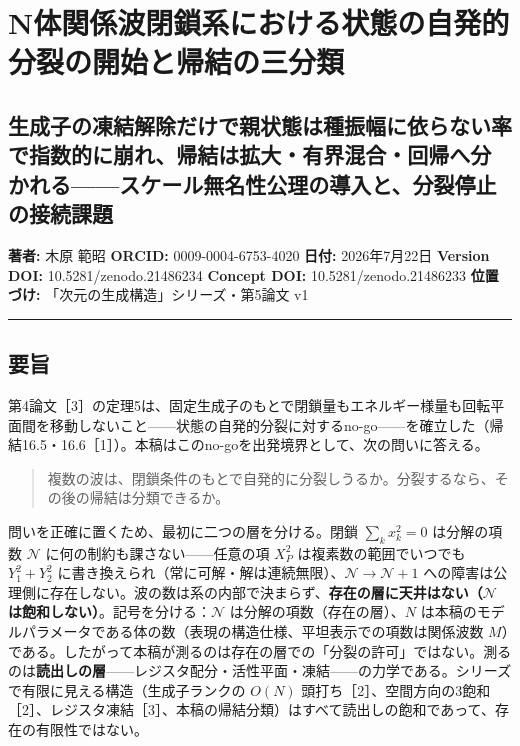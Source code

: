 \documentclass[
  a4paper,
]{ltjsarticle}
\author{}
\date{}
\begin{document}
\section{N体関係波閉鎖系における状態の自発的分裂の開始と帰結の三分類}\label{nux4f53ux95a2ux4fc2ux6ce2ux9589ux9396ux7cfbux306bux304aux3051ux308bux72b6ux614bux306eux81eaux767aux7684ux5206ux88c2ux306eux958bux59cbux3068ux5e30ux7d50ux306eux4e09ux5206ux985e}

\subsection{生成子の凍結解除だけで親状態は種振幅に依らない率で指数的に崩れ、帰結は拡大・有界混合・回帰へ分かれる------スケール無名性公理の導入と、分裂停止の接続課題}\label{ux751fux6210ux5b50ux306eux51cdux7d50ux89e3ux9664ux3060ux3051ux3067ux89aaux72b6ux614bux306fux7a2eux632fux5e45ux306bux4f9dux3089ux306aux3044ux7387ux3067ux6307ux6570ux7684ux306bux5d29ux308cux5e30ux7d50ux306fux62e1ux5927ux6709ux754cux6df7ux5408ux56deux5e30ux3078ux5206ux304bux308cux308bux30b9ux30b1ux30fcux30ebux7121ux540dux6027ux516cux7406ux306eux5c0eux5165ux3068ux5206ux88c2ux505cux6b62ux306eux63a5ux7d9aux8ab2ux984c}

\textbf{著者:} 木原 範昭 \textbf{ORCID:} 0009-0004-6753-4020
\textbf{日付:} 2026年7月22日 \textbf{Version DOI:}
10.5281/zenodo.21486234 \textbf{Concept DOI:} 10.5281/zenodo.21486233
\textbf{位置づけ:} 「次元の生成構造」シリーズ・第5論文 v1

\begin{center}\rule{0.5\linewidth}{0.5pt}\end{center}

\subsection{要旨}\label{ux8981ux65e8}

第4論文［3］の定理5は、固定生成子のもとで閉鎖量もエネルギー様量も回転平面間を移動しないこと------状態の自発的分裂に対するno-go------を確立した（帰結16.5・16.6［1］）。本稿はこのno-goを出発境界として、次の問いに答える。

\begin{quote}
複数の波は、閉鎖条件のもとで自発的に分裂しうるか。分裂するなら、その後の帰結は分類できるか。
\end{quote}

問いを正確に置くため、最初に二つの層を分ける。閉鎖 \(\sum_k x_k^2=0\)
は分解の項数 \(\mathcal N\) に何の制約も課さない------任意の項 \(X_P^2\)
は複素数の範囲でいつでも \(Y_1^2+Y_2^2\)
に書き換えられ（常に可解・解は連続無限）、\(\mathcal N\to\mathcal N+1\)
への障害は公理側に存在しない。波の数は系の内部で決まらず、\textbf{存在の層に天井はない（\(\mathcal N\)
は飽和しない）}。記号を分ける：\(\mathcal N\)
は分解の項数（存在の層）、\(N\)
は本稿のモデルパラメータである体の数（表現の構造仕様、平坦表示での項数は関係波数
\(M\)）である。したがって本稿が測るのは存在の層での「分裂の許可」ではない。測るのは\textbf{読出しの層}------レジスタ配分・活性平面・凍結------の力学である。シリーズで有限に見える構造（生成子ランクの
\(O(N)\)
頭打ち［2］、空間方向の3飽和［2］、レジスタ凍結［3］、本稿の帰結分類）はすべて読出しの飽和であって、存在の有限性ではない。
\end{document}
